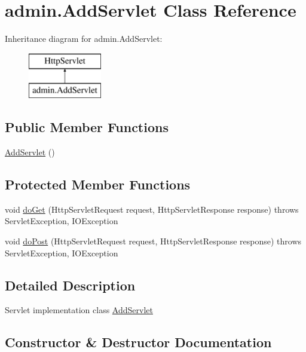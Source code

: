 \hypertarget{classadmin_1_1_add_servlet}{}\section{admin.\+Add\+Servlet Class Reference}
\label{classadmin_1_1_add_servlet}
Inheritance diagram for admin.\+Add\+Servlet\+:\begin{figure}[H]
\begin{center}
\leavevmode
\includegraphics[height=2.000000cm]{classadmin_1_1_add_servlet}
\end{center}
\end{figure}
\subsection*{Public Member Functions}
\begin{DoxyCompactItemize}
\item 
\hyperlink{classadmin_1_1_add_servlet_a8e5e2cb34988a4a3cfbc766448be1fc4}{Add\+Servlet} ()
\end{DoxyCompactItemize}
\subsection*{Protected Member Functions}
\begin{DoxyCompactItemize}
\item 
void \hyperlink{classadmin_1_1_add_servlet_adbc63c3d39dcf577c95795457718f95e}{do\+Get} (Http\+Servlet\+Request request, Http\+Servlet\+Response response)  throws Servlet\+Exception, I\+O\+Exception 
\item 
void \hyperlink{classadmin_1_1_add_servlet_a1297b03c40f87a6dff6f3042448583f6}{do\+Post} (Http\+Servlet\+Request request, Http\+Servlet\+Response response)  throws Servlet\+Exception, I\+O\+Exception 
\end{DoxyCompactItemize}


\subsection{Detailed Description}
Servlet implementation class \hyperlink{classadmin_1_1_add_servlet}{Add\+Servlet} 

\subsection{Constructor \& Destructor Documentation}
